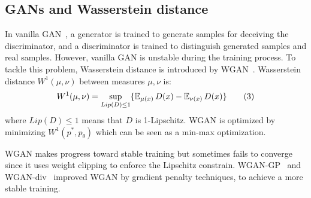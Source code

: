 \subsection{GANs and Wasserstein distance}

In vanilla GAN~\cite{goodfellow2014generative}, a generator is trained to generate samples for deceiving the discriminator, and a discriminator is trained to distinguish generated samples and real samples. However, vanilla GAN is unstable during the training process. To tackle this problem, Wasserstein distance is introduced by WGAN~\cite{arjovsky2017wasserstein}. Wasserstein distance $W^1(\mu, \nu)$ between measures $\mu, \nu$ is:
\begin{align*} \label{eq:Wasserstein-distance}
W^1(\mu, \nu) = \sup_{Lip(D) \leq 1} \{\operatorname{\mathbb{E}}_{\mu(x)} D(x)  - \operatorname{\mathbb{E}}_{\nu(x)} D(x)\} \tag{3}
\end{align*}
where $Lip(D) \leq 1$ means that $D$ is 1-Lipschitz. WGAN is optimized by minimizing $W^1(p^*, p_\theta)$ which can be seen as a min-max optimization. 

WGAN makes progress toward stable training but sometimes fails to converge since it uses weight clipping to enforce the Lipschitz constrain. WGAN-GP~\cite{gulrajani2017improved} and WGAN-div~\cite{wu2018wasserstein} improved WGAN by gradient penalty techniques, to achieve a more stable training.